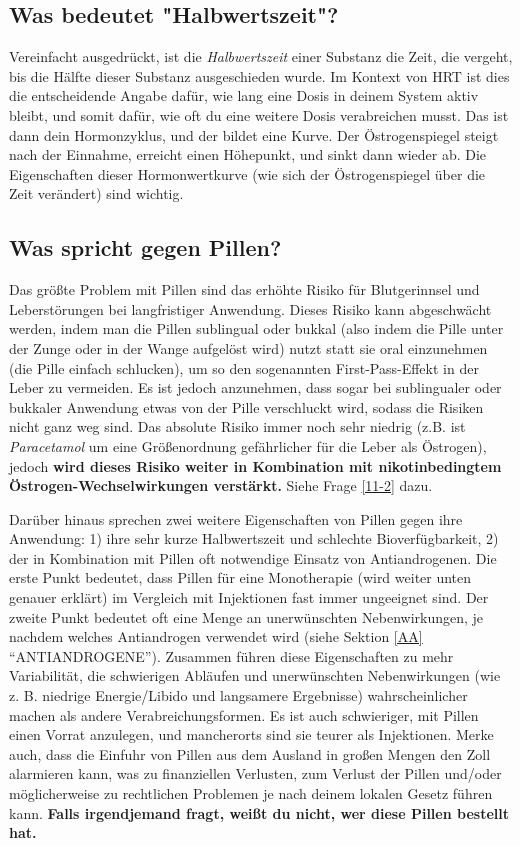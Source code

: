 \documentclass{article}
\begin{document}
\subsection{Was bedeutet "Halbwertszeit"?}

Vereinfacht ausgedrückt, ist die \textit{Halbwertszeit} einer Substanz die Zeit, die vergeht, bis die Hälfte dieser Substanz ausgeschieden wurde. Im Kontext von HRT ist dies die entscheidende Angabe dafür, wie lang eine Dosis in deinem System aktiv bleibt, und somit dafür, wie oft du eine weitere Dosis verabreichen musst. Das ist dann dein Hormonzyklus, und der bildet eine Kurve. Der Östrogenspiegel steigt nach der Einnahme, erreicht einen Höhepunkt, und sinkt dann wieder ab. Die Eigenschaften dieser Hormonwertkurve (wie sich der Östrogenspiegel über die Zeit verändert) sind wichtig.

\subsection{Was spricht gegen Pillen?}

Das größte Problem mit Pillen sind das erhöhte Risiko für Blutgerinnsel und Leberstörungen bei langfristiger Anwendung. Dieses Risiko kann abgeschwächt werden, indem man die Pillen sublingual oder bukkal (also indem die Pille unter der Zunge oder in der Wange aufgelöst wird) nutzt statt sie oral einzunehmen (die Pille einfach schlucken), um so den sogenannten First-Pass-Effekt in der Leber zu vermeiden. Es ist jedoch anzunehmen, dass sogar bei sublingualer oder bukkaler Anwendung etwas von der Pille verschluckt wird, sodass die Risiken nicht ganz weg sind. Das absolute Risiko immer noch sehr niedrig (z.B. ist \textit{Paracetamol} um eine Größenordnung gefährlicher für die Leber als Östrogen), jedoch \textbf{wird dieses Risiko weiter in Kombination mit nikotinbedingtem Östrogen-Wechselwirkungen verstärkt.} Siehe Frage \ref{11-2} dazu.

Darüber hinaus sprechen zwei weitere Eigenschaften von Pillen gegen ihre Anwendung: 1) ihre sehr kurze Halbwertszeit und schlechte Bioverfügbarkeit, 2) der in Kombination mit Pillen oft notwendige Einsatz von Antiandrogenen. Die erste Punkt bedeutet, dass Pillen für eine Monotherapie (wird weiter unten genauer erklärt) im Vergleich mit Injektionen fast immer ungeeignet sind. Der zweite Punkt bedeutet oft eine Menge an unerwünschten Nebenwirkungen, je nachdem welches Antiandrogen verwendet wird (siehe Sektion \ref{AA} “ANTIANDROGENE”). Zusammen führen diese Eigenschaften zu mehr Variabilität, die schwierigen Abläufen und unerwünschten Nebenwirkungen (wie z. B. niedrige Energie/Libido und langsamere Ergebnisse) wahrscheinlicher machen als andere Verabreichungsformen. Es ist auch schwieriger, mit Pillen einen Vorrat anzulegen, und mancherorts sind sie teurer als Injektionen. Merke auch, dass die Einfuhr von Pillen aus dem Ausland in großen Mengen den Zoll alarmieren kann, was zu finanziellen Verlusten, zum Verlust der Pillen und/oder möglicherweise zu rechtlichen Problemen je nach deinem lokalen Gesetz führen kann. \textbf{Falls irgendjemand fragt, weißt du nicht, wer diese Pillen bestellt hat.}
\end{document}
